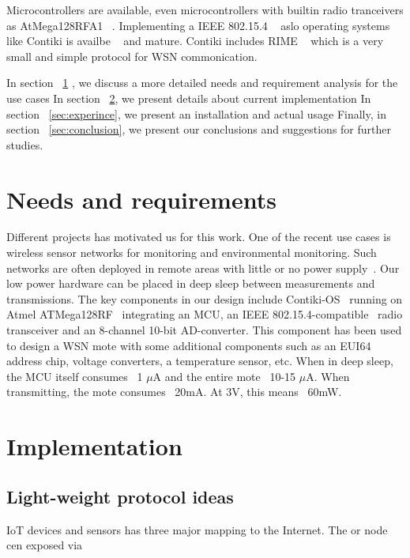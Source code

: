 \documentclass[conference, a4paper,10pt,twocolumn]{IEEEtran}
\begin{document}
Microcontrollers are available, even microcontrollers with builtin radio tranceivers 
as AtMega128RFA1 ~\cite{ATMEGA}. Implementing a IEEE 802.15.4 ~\cite{802154} aslo operating 
systems like Contiki is availbe ~\cite{CONTIKI} and mature. Contiki includes RIME ~\cite{CONTIKI} 
which is a very small and simple protocol for WSN commonication.


In section ~\ref{sec:needs} , we discuss a more detailed needs and requirement analysis for the use cases
In section ~\ref{sec:implementation}, we present details about current implementation  
In section ~\ref{sec:experince}, we present an installation and actual usage
Finally, in section ~\ref{sec:conclusion}, we present our conclusions and suggestions for further studies.

\section{Needs and requirements}
\label{sec:needs}


Different projects has motivated us for this work. One of the recent use cases is wireless sensor 
networks for monitoring and environmental monitoring.
Such networks are often deployed in remote areas with little or no power supply~\cite{UBIQUI}.  
Our low power hardware can be placed in deep sleep between measurements and transmissions.  The key 
components in our design include  Contiki-OS~\cite{CONTIKI} running on Atmel ATMega128RF~\cite{ATMEGA} 
integrating an MCU, an IEEE 802.15.4-compatible~\cite{802154} radio transceiver and an 8-channel 10-bit 
AD-converter. This component has been used to design a WSN mote with some additional components such 
as an EUI64 address chip, voltage converters, a temperature sensor, etc. When in deep sleep, the MCU 
itself consumes ~1 $\mu$A and the entire mote ~10-15 $\mu$A. When transmitting, the mote consumes 
~20mA. At 3V, this means ~60mW. 


\section{Implementation}
\label{sec:implementation}

\subsection{Light-weight protocol ideas}

IoT devices and sensors has three major mapping to the Internet. The 
or node cen exposed via
\end{document}
